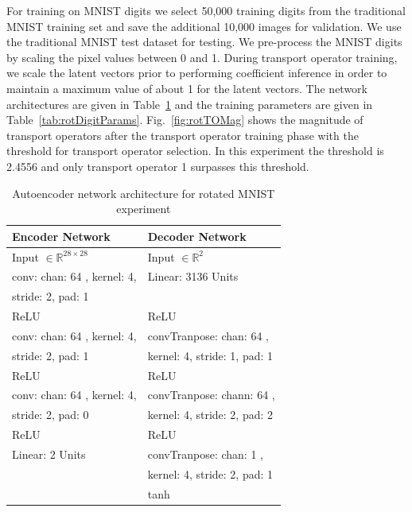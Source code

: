 \documentclass[letterpaper]{article} %
\begin{document}
For training on MNIST digits we select 50,000 training digits from the traditional MNIST training set and save the additional 10,000 images for validation. We use the traditional MNIST test dataset for testing. We pre-process the MNIST digits by scaling the pixel values between 0 and 1. During transport operator training, we scale the latent vectors prior to performing coefficient inference in order to maintain a maximum value of about 1 for the latent vectors. The network architectures are given in Table~\ref{tab:rotDigitNet} and the training parameters are given in Table~\ref{tab:rotDigitParams}. Fig.~\ref{fig:rotTOMag} shows the magnitude of transport operators after the transport operator training phase with the threshold for transport operator selection. In this experiment the threshold is 2.4556 and only transport operator 1 surpasses this threshold.

\begin{table}[t]
\centering
\begin{tabular}{||l l||}
\hline
Encoder Network & Decoder Network  \\
\hline
Input $\in \mathbb{R}^{28 \times 28}$ & Input $\in \mathbb{R}^2$  \\
conv: chan: 64 , kernel: 4,  & Linear: 3136 Units  \\
stride: 2, pad: 1 & \\
ReLU & ReLU \\
conv: chan: 64 , kernel: 4,  & convTranpose: chan: 64 ,   \\
stride: 2, pad: 1 & kernel: 4, stride: 1, pad: 1 \\
ReLU & ReLU \\
conv: chan: 64 , kernel: 4,  & convTranpose: chann: 64 ,   \\
stride: 2, pad: 0 & kernel: 4, stride: 2, pad: 2 \\
ReLU & ReLU \\
Linear: 2 Units & convTranpose: chan: 1 ,   \\
& kernel: 4, stride: 2, pad: 1 \\
& tanh \\
\hline
\end{tabular}
\caption{Autoencoder network architecture for rotated MNIST experiment}
\label{tab:rotDigitNet}
\end{table}
\end{document}
